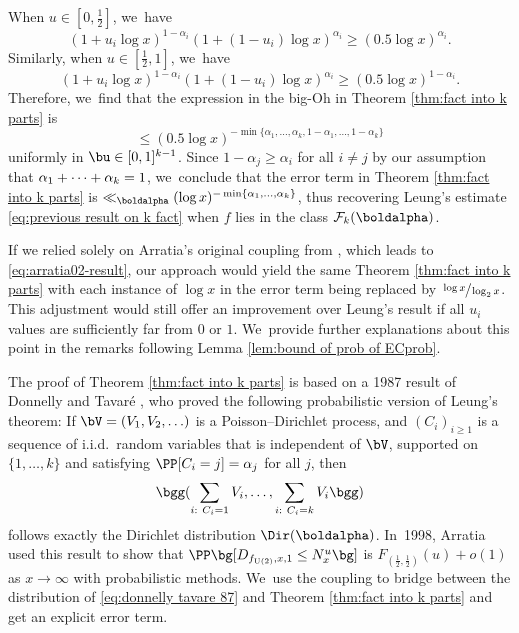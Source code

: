\skpt\begin{remss}
\begin{enumeratea}
\item
When $u\in[0,\frac{1}{2}]$, we~have
\[
(1+u_i\log x)^{1-\alpha_i}(1+(1-u_i)\log x)^{\alpha_i}\ge (0.5\log x)^{\alpha_i}.
\]
Similarly, when $u\in[\frac{1}{2},1]$, we~have
\[
(1+u_i\log x)^{1-\alpha_i}(1+(1-u_i)\log x)^{\alpha_i}\ge (0.5\log x)^{1-\alpha_i}.
\]
Therefore, we~find that the expression in the big-Oh in Theorem \ref{thm:fact into k parts} is
\[
\le (0.5\log x)^{-\min\{\alpha_1,\dots,\alpha_k,1-\alpha_1,\dots,1-\alpha_k\} }
\]
uniformly in $\bu\in[0,1]^{k-1}$. Since $1-\alpha_j\ge\alpha_i$ for all $i\neq j$ by our assumption that $\alpha_1+\nobreak\cdots+\alpha_k=1$, we~conclude that the error term in Theorem \ref{thm:fact into k parts} is \hbox{$\ll_{\boldalpha} (\log x)^{-\min\{\alpha_1,\dots,\alpha_k\}}$}, thus recovering Leung's estimate \eqref{eq:previous result on k fact} when $f$ lies in the class $\mathcal{F}_k(\boldalpha)$.

\item
If we relied solely on Arratia's original coupling from \cite{Arratia02}, which leads to \eqref{eq:arratia02-result}, our approach would yield the same Theorem \ref{thm:fact into k parts} with each instance of $\log x$ in the error term being replaced by $\sfrac{\log x}{\log_2 x}$. This adjustment would still offer an improvement over Leung's result if all $u_i$ values are sufficiently far from $0$ or $1$. We~provide further explanations about this point in the remarks following Lemma \ref{lem:bound of prob of ECprob}.
\end{enumeratea}
\end{remss}

The proof of Theorem \ref{thm:fact into k parts} is based on a 1987 result of Donnelly and Tavaré \cite{DonnellyTavare87}, who proved the following probabilistic version of Leung's theorem: If $\bV = (V_1, V_2, \ldots)$ is a Poisson--Dirichlet process, and $(C_i)_{i \ge 1}$ is a sequence of i.i.d.~random variables that is independent of $\bV$, supported on $\{1, \ldots, k\}$ and satisfying $\PP[C_i = j] = \alpha_j$ for all $j$, then
\begin{equation}
\label{eq:donnelly tavare 87}
\bgg(\sum_{i:\ C_i = 1} V_i, \ldots, \sum_{i:\ C_i = k} V_i\bgg)
\end{equation}
follows exactly the Dirichlet distribution $\Dir(\boldalpha)$. In~1998, Arratia \cite{Arratia98} used this result to show that $\PP\bg[D_{f_{\mathrm U(2)}, x, 1} \le N_x^u\bg]$ is $F_{(\frac{1}{2}, \frac{1}{2})}(u) + o(1)$ as $x \to \infty$ with probabilistic methods. We~use the coupling to bridge between the distribution of \eqref{eq:donnelly tavare 87} and Theorem \ref{thm:fact into k parts} and get an explicit error term.

